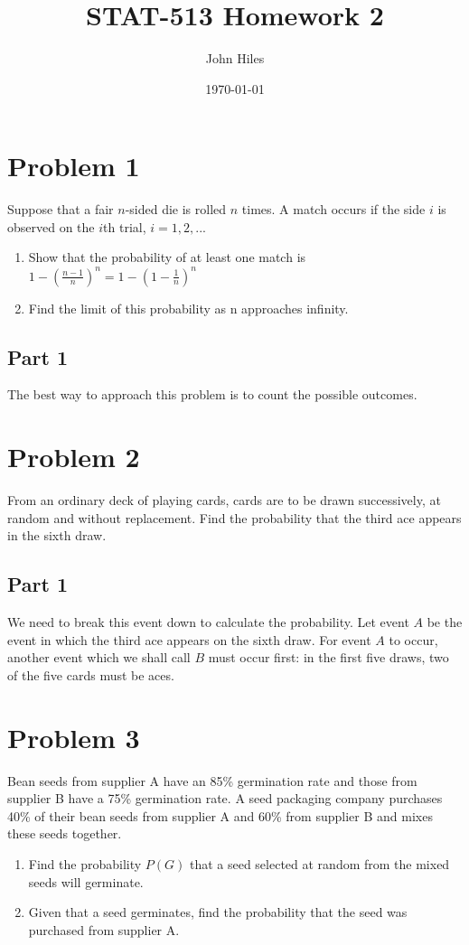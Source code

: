 \documentclass{article}
\title{STAT-513 Homework 2}
\author{John Hiles}
\date\today
\begin{document}
\maketitle %


\section*{Problem 1}
Suppose that a fair $n$-sided die is rolled $n$ times. A match occurs if the side $i$ is observed on the $i$th trial, $i=1,2,...$
\begin{enumerate}
\item
Show that the probability of at least one match is $1-(\frac{n-1}{n})^n = 1-(1-\frac{1}{n})^n$
\item
Find the limit of this probability as n approaches infinity.
\end{enumerate}

\subsection*{Part 1}
The best way to approach this problem is to count the possible outcomes. 

\clearpage

\section*{Problem 2}
From an ordinary deck of playing cards, cards are to be drawn successively, at random and without replacement. Find the probability that the third ace appears in the sixth draw.
\subsection*{Part 1}
We need to break this event down to calculate the probability.
Let event $A$ be the event in which the third ace appears on the sixth draw.
For event $A$ to occur, another event which we shall call $B$ must occur first: in the first five draws, two of the five cards must be aces.
\clearpage
\section*{Problem 3}
Bean seeds from supplier A have an 85\% germination rate and those from supplier B have a 75\% germination rate. A seed packaging company purchases 40\% of their bean seeds from supplier A and 60\% from supplier B and mixes these seeds together.
\begin{enumerate}


\item
Find the probability $P(G)$ that a seed selected at random from the mixed seeds will germinate.
\item
Given that a seed germinates, find the probability that the seed was purchased from supplier A.
\end{enumerate}
\end{document}
